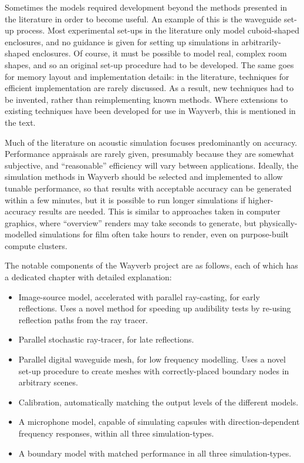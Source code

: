\documentclass[]{scrreprt}
\providecommand{\tightlist}{%
  \setlength{\itemsep}{0pt}\setlength{\parskip}{0pt}}
\begin{document}
Sometimes the models required development beyond the methods presented
in the literature in order to become useful. An example of this is the
waveguide set-up process. Most experimental set-ups in the literature
only model cuboid-shaped enclosures, and no guidance is given for
setting up simulations in arbitrarily-shaped enclosures. Of course, it
must be possible to model real, complex room shapes, and so an original
set-up procedure had to be developed. The same goes for memory layout
and implementation details: in the literature, techniques for efficient
implementation are rarely discussed. As a result, new techniques had to
be invented, rather than reimplementing known methods. Where extensions
to existing techniques have been developed for use in Wayverb, this is
mentioned in the text.

Much of the literature on acoustic simulation focuses predominantly on
accuracy. Performance appraisals are rarely given, presumably because
they are somewhat subjective, and ``reasonable'' efficiency will vary
between applications. Ideally, the simulation methods in Wayverb should
be selected and implemented to allow tunable performance, so that
results with acceptable accuracy can be generated within a few minutes,
but it is possible to run longer simulations if higher-accuracy results
are needed. This is similar to approaches taken in computer graphics,
where ``overview'' renders may take seconds to generate, but
physically-modelled simulations for film often take hours to render,
even on purpose-built compute clusters.

The notable components of the Wayverb project are as follows, each of
which has a dedicated chapter with detailed explanation:

\begin{itemize}
\tightlist
\item
  Image-source model, accelerated with parallel ray-casting, for early
  reflections. Uses a novel method for speeding up audibility tests by
  re-using reflection paths from the ray tracer.
\item
  Parallel stochastic ray-tracer, for late reflections.
\item
  Parallel digital waveguide mesh, for low frequency modelling. Uses a
  novel set-up procedure to create meshes with correctly-placed boundary
  nodes in arbitrary scenes.
\item
  Calibration, automatically matching the output levels of the different
  models.
\item
  A microphone model, capable of simulating capsules with
  direction-dependent frequency responses, within all three
  simulation-types.
\item
  A boundary model with matched performance in all three
  simulation-types.
\end{itemize}
\end{document}
